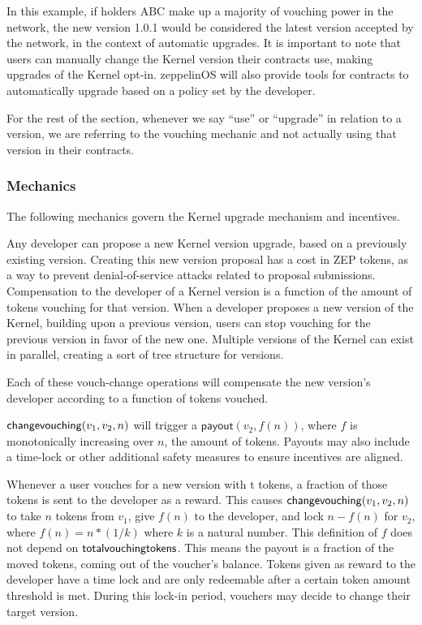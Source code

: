 \documentclass[]{article}
\makeatletter
\let\_\relax
\DeclareRobustCommand{\_}{%
  \leavevmode\vbox{%
    \hrule\@width.5em
          \@height-.26ex
          \@depth\dimexpr.26ex+.28pt\relax}}
\makeatother
\begin{document}
In this example, if holders ABC make up a majority of vouching power in
the network, the new version 1.0.1 would be considered the latest
version accepted by the network, in the context of automatic
upgrades. It is important to note that users can manually change the
Kernel version their contracts use, making upgrades of the Kernel
opt-in. zeppelinOS will also provide tools for contracts to
automatically upgrade based on a policy set by the developer.

For the rest of the section, whenever we say ``use'' or ``upgrade'' in
relation to a version, we are referring to the vouching mechanic and not
actually using that version in their contracts.

\subsubsection{Mechanics}

The following mechanics govern the Kernel upgrade mechanism and
incentives.

Any developer can propose a new Kernel version upgrade, based on a
previously existing version. Creating this new version proposal has a
cost in ZEP tokens, as a way to prevent denial-of-service attacks
related to proposal submissions. Compensation to the
developer of a Kernel version is a function of the amount of tokens
vouching for that version. When a developer proposes a new version of
the Kernel, building upon a previous version, users can stop
vouching for the previous version in favor of the new one.
Multiple versions of the Kernel can exist in parallel, creating a sort
of tree structure for versions.

Each of these vouch-change operations will compensate the new version's
developer according to a function of tokens vouched.

$\mathsf{change\_vouching}(v_1, v_2, n)$ will trigger a
$\mathsf{payout}(v_2, f(n))$, where $f$ is monotonically increasing over $n$,
the amount of tokens. Payouts may also include a time-lock or other additional
safety measures to ensure incentives are aligned.

Whenever a user vouches for a new version with t tokens, a fraction of
those tokens is sent to the developer as a reward. This causes
$\mathsf{change\_vouching}(v_1, v_2, n)$ to take $n$ tokens from $v_1$, give $f(n)$
to the developer, and lock $n - f(n)$ for $v_2$, where $f(n) = n * (1/k)$
where $k$ is a natural number. This definition of $f$ does not depend
on $\mathsf{total\_vouching\_tokens}$. This means the payout is a fraction of the
moved tokens, coming out of the voucher's balance.
Tokens given as reward to the developer have a time lock and are only
redeemable after a certain token amount threshold is met. During this lock-in
period, vouchers may decide to change their target version.
\end{document}
